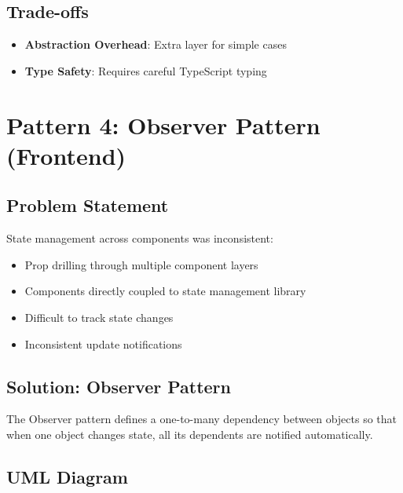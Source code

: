 \documentclass[12pt,a4paper]{article}
\begin{document}
\subsection{Trade-offs}
\begin{itemize}
    \item \textbf{Abstraction Overhead}: Extra layer for simple cases
    \item \textbf{Type Safety}: Requires careful TypeScript typing
\end{itemize}

\newpage

\section{Pattern 4: Observer Pattern (Frontend)}

\subsection{Problem Statement}

State management across components was inconsistent:
\begin{itemize}
    \item Prop drilling through multiple component layers
    \item Components directly coupled to state management library
    \item Difficult to track state changes
    \item Inconsistent update notifications
\end{itemize}

\subsection{Solution: Observer Pattern}

The Observer pattern defines a one-to-many dependency between objects so that when one object changes state, all its dependents are notified automatically.

\subsection{UML Diagram}
\end{document}
